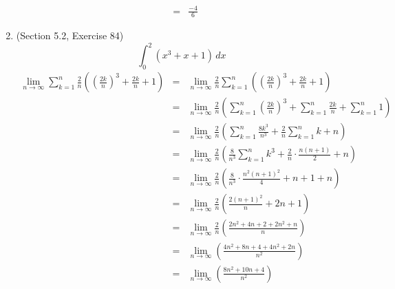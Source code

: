 \documentclass{article}
\begin{document}
\begin{enumerate}
\begin{eqnarray}
                                                                                                         &=& \frac{-4}{6}
        \end{eqnarray}
    \item (Section 5.2, Exercise 84)
        $$\int_0^2{\left(x^3 + x + 1\right)\,dx}$$
        \begin{eqnarray}
            \lim_{n \to \infty}{\sum_{k = 1}^n{\frac{2}{n}\left(\left(\frac{2k}{n}\right)^3 + \frac{2k}{n} + 1\right)}} &=& \lim_{n \to \infty}{\frac{2}{n}\sum_{k = 1}^n{\left(\left(\frac{2k}{n}\right)^3 + \frac{2k}{n} + 1\right)}} \\
                                                                                                                        &=& \lim_{n \to \infty}{\frac{2}{n}\left(\sum_{k = 1}^n{\left(\frac{2k}{n}\right)^3} + \sum_{k = 1}^n{\frac{2k}{n}} + \sum_{k = 1}^n{1}\right)} \\
                                                                                                                        &=& \lim_{n \to \infty}{\frac{2}{n}\left(\sum_{k = 1}^n{\frac{8k^3}{n^3}} + \frac{2}{n}\sum_{k = 1}^n{k} + n\right)} \\
                                                                                                                        &=& \lim_{n \to \infty}{\frac{2}{n}\left(\frac{8}{n^3}\sum_{k = 1}^n{k^3} + \frac{2}{n} \cdot \frac{n(n + 1)}{2} + n\right)} \\
                                                                                                                        &=& \lim_{n \to \infty}{\frac{2}{n}\left(\frac{8}{n^3} \cdot \frac{n^2(n + 1)^2}{4} + n + 1 + n\right)} \\
                                                                                                                        &=& \lim_{n \to \infty}{\frac{2}{n}\left(\frac{2(n + 1)^2}{n} + 2n + 1\right)} \\
                                                                                                                        &=& \lim_{n \to \infty}{\frac{2}{n}\left(\frac{2n^2 + 4n + 2 + 2n^2 + n}{n}\right)} \\
                                                                                                                        &=& \lim_{n \to \infty}{\left(\frac{4n^2 + 8n + 4 + 4n^2 + 2n}{n^2}\right)} \\
                                                                                                                        &=& \lim_{n \to \infty}{\left(\frac{8n^2 + 10n + 4}{n^2}\right)} \\

\end{eqnarray}
\end{enumerate}
\end{document}
